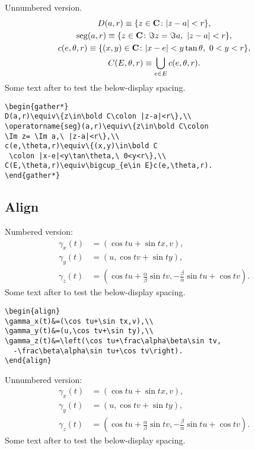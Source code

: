Unnumbered version.
\begin{gather*}
D(a,r)\equiv\{z\in\bold C\colon |z-a|<r\},\\
\operatorname{seg}(a,r)\equiv\{z\in\bold C\colon
\Im z= \Im a,\ |z-a|<r\},\\
c(e,\theta,r)\equiv\{(x,y)\in\bold C
 \colon |x-e|<y\tan\theta,\ 0<y<r\},\\
C(E,\theta,r)\equiv\bigcup_{e\in E}c(e,\theta,r).
\end{gather*}
Some text after to test the below-display spacing.
\begin{verbatim}
\begin{gather*}
D(a,r)\equiv\{z\in\bold C\colon |z-a|<r\},\\
\operatorname{seg}(a,r)\equiv\{z\in\bold C\colon
\Im z= \Im a,\ |z-a|<r\},\\
c(e,\theta,r)\equiv\{(x,y)\in\bold C
 \colon |x-e|<y\tan\theta,\ 0<y<r\},\\
C(E,\theta,r)\equiv\bigcup_{e\in E}c(e,\theta,r).
\end{gather*}
\end{verbatim}

\newpage
\subsection{Align}
Numbered version:
\begin{align}
\gamma_x(t)&=(\cos tu+\sin tx,v),\\
\gamma_y(t)&=(u,\cos tv+\sin ty),\\
\gamma_z(t)&=\left(\cos tu+\frac\alpha\beta\sin tv,
  -\frac\beta\alpha\sin tu+\cos tv\right).
\end{align}
Some text after to test the below-display spacing.

\begin{verbatim}
\begin{align}
\gamma_x(t)&=(\cos tu+\sin tx,v),\\
\gamma_y(t)&=(u,\cos tv+\sin ty),\\
\gamma_z(t)&=\left(\cos tu+\frac\alpha\beta\sin tv,
  -\frac\beta\alpha\sin tu+\cos tv\right).
\end{align}
\end{verbatim}

Unnumbered version:
\begin{align*}
\gamma_x(t)&=(\cos tu+\sin tx,v),\\
\gamma_y(t)&=(u,\cos tv+\sin ty),\\
\gamma_z(t)&=\left(\cos tu+\frac\alpha\beta\sin tv,
  -\frac\beta\alpha\sin tu+\cos tv\right).
\end{align*}
Some text after to test the below-display spacing.

